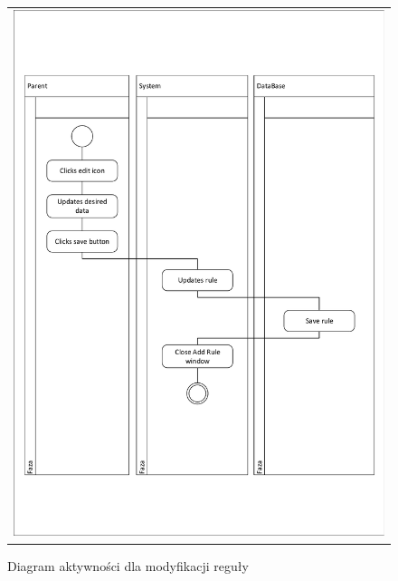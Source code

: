 \documentclass{sprawozdanie-agh}
\begin{document}
			\begin{figure}[H]
				\centering
				\begin{tabular}{c}
					\includegraphics[width=.95\textwidth]{crudUpdate_cropped} 
				\end{tabular}
			\caption{Diagram aktywności dla modyfikacji reguły}
			\end{figure}
\end{document}
